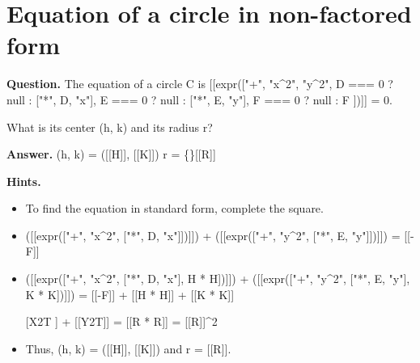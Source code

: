 \documentclass{article}
\begin{document}
\section*{Equation of a circle in non-factored form}
\textbf{Question.} The equation of a circle C is
                    [[expr(["+",
                        "x\textasciicircum{}2",
                        "y\textasciicircum{}2",
                        D === 0 ? null : ["*", D, "x"],
                        E === 0 ? null : ["*", E, "y"],
                        F === 0 ? null : F
                    ])]] = 0.

                What is its center (h, k) and its radius r?

\textbf{Answer.} (h, k) = ([[H]], [[K]])
                r = \{\}[[R]]

\textbf{Hints.}
\begin{itemize}
  \item To find the equation in standard form, complete the square.
  \item ([[expr(["+", "x\textasciicircum{}2", ["*", D, "x"]])]]) + ([[expr(["+", "y\textasciicircum{}2", ["*", E, "y"]])]]) = [[-F]]
  \item ([[expr(["+", "x\textasciicircum{}2", ["*", D, "x"], H * H])]]) + ([[expr(["+", "y\textasciicircum{}2", ["*", E, "y"], K * K])]]) = [[-F]] + [[H * H]] + [[K * K]]
  \item [[X2T]] + [[Y2T]] = [[R * R]] = [[R]]\textasciicircum{}2
  \item Thus, (h, k) = ([[H]], [[K]]) and r = [[R]].
\end{itemize}
\end{document}
